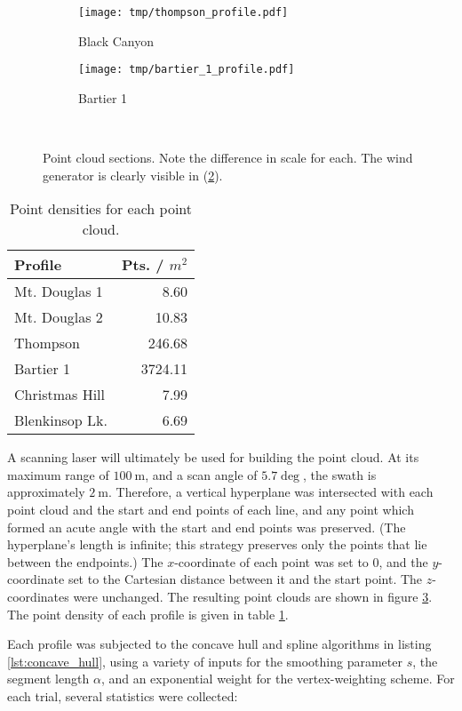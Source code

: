 \documentclass[doc]{apa6}
\begin{document}
\begin{figure}\ContinuedFloat
\begin{subfigure}[b]{\linewidth}
\texttt{[image: tmp/thompson\_profile.pdf]} 
\caption{Black Canyon} \label{subfig:thompson}
\end{subfigure}
\begin{subfigure}[b]{\linewidth}
\texttt{[image: tmp/bartier\_1\_profile.pdf]} 
\caption{Bartier 1} \label{subfig:bartier_1}
\end{subfigure}
~
\caption{Point cloud sections. Note the difference in scale for each. The wind generator is clearly visible in (\ref{subfig:bartier_1}).}
\label{fig:profiles}
\end{figure}

\begin{table}
\caption{Point densities for each point cloud.}
\label{table:pt_density}
\begin{tabular}{l || r} 
Profile & Pts. / $m^2$ \\
\hline
Mt. Douglas 1  & 8.60 \\
Mt. Douglas 2  & 10.83 \\
Thompson       & 246.68 \\
Bartier 1      & 3724.11 \\
Christmas Hill & 7.99 \\
Blenkinsop Lk. & 6.69 \\
\end{tabular}
\end{table}


A scanning laser will ultimately be used for building the point cloud. At its maximum range of $\SI{100}\m$, and a scan angle of $\SI{5.7}\deg$, the swath is approximately $\SI{2}\m$. Therefore, a vertical hyperplane was intersected with each point cloud and the start and end points of each line, and any point which formed an acute angle with the start and end points was preserved. (The hyperplane's length is infinite; this strategy preserves only the points that lie between the endpoints.) The $x$-coordinate of each point was set to $0$, and the $y$-coordinate set to the Cartesian distance between it and the start point. The $z$-coordinates were unchanged. The resulting point clouds are shown in figure \ref{fig:profiles}. The point density of each profile is given in table \ref{table:pt_density}.

Each profile was subjected to the concave hull and spline algorithms in listing \ref{lst:concave_hull}, using a variety of inputs for the smoothing parameter $s$, the segment length $\alpha$, and an exponential weight for the vertex-weighting scheme. For each trial, several statistics were collected:
\end{document}
